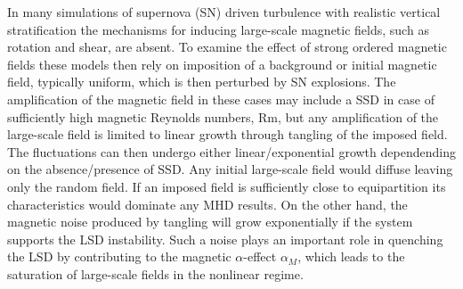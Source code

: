 \documentclass[preprint2]{aastex63}
\newcommand{\ns}[1]{\textcolor{orange}{#1}}
\begin{document}
In many simulations of supernova (SN) driven turbulence with realistic vertical 
stratification \citep[e.g.,][]{deAvillez:2005,PO07,Hill:2012a,HI14} the
mechanisms for inducing large-scale magnetic fields, such as rotation
and shear, are absent. To examine the effect of strong ordered magnetic fields these models then rely
on imposition of a background or initial magnetic field, typically uniform,
which is then perturbed by SN explosions.
The amplification of the magnetic field in these cases may include a
SSD in case of sufficiently high magnetic Reynolds numbers, Rm, but
any amplification of the 
large-scale field is limited to linear growth through tangling of the imposed
field.
The fluctuations can then undergo either linear/exponential growth dependending on the absence/presence of SSD.
Any initial large-scale field would diffuse leaving only the random field. 
If an imposed field is sufficiently close to equipartition its characteristics
would dominate any MHD results.
     On the other hand, the magnetic noise produced by tangling
will grow exponentially if the system supports the LSD instability.
Such a noise plays an important role in quenching the LSD by contributing
to the magnetic $\alpha$-effect $\alpha_M$, which leads to the saturation
of large-scale fields in the nonlinear regime.
\end{document}
